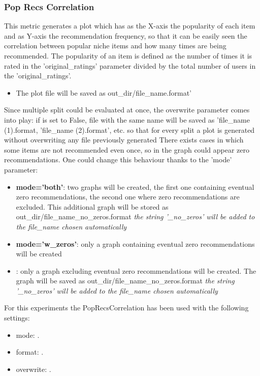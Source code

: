 \documentclass[11pt]{article}
\begin{document}
\subsubsection{Pop Recs Correlation}\label{sec:popRC}
This metric generates a plot which has as the X-axis the popularity of each item and as Y-axis the recommendation
frequency, so that it can be easily seen the correlation between popular niche items and how many times are being
recommended.
The popularity of an item is defined as the number of times it is rated in the 'original_ratings' parameter
divided by the total number of users in the 'original_ratings'.
\begin{itemize}
    \item The plot file will be saved as out_dir/file_name.format'
\end{itemize}
\hfill\break
\hfill\break
Since multiple split could be evaluated at once, the overwrite parameter comes into play:
if is set to False, file with the same name will be saved as 'file_name (1).format, 'file_name (2).format', etc.
so that for every split a plot is generated without overwriting any file previously generated
\hfill\break
\hfill\break
There exists cases in which some items are not recommended even once, so in the graph could appear
zero recommendations. One could change this behaviour thanks to the 'mode' parameter:
\begin{itemize}
    \item \textbf{mode='both'}: two graphs will be created, the first one containing eventual zero recommendations, the
      second one where zero recommendations are excluded. This additional graph will be stored as
      out_dir/file_name_no_zeros.format \textit{the string '_no_zeros' will be added to the file_name chosen automatically}
    \item \textbf{mode='w_zeros'}: only a graph containing eventual zero recommendations will be created
    \item {}: only a graph excluding eventual zero recommendations will be created. The graph will be
      saved as out_dir/file_name_no_zeros.format \textit{the string '_no_zeros' will be added to the file_name chosen automatically}
\end{itemize}
\hfill\break
\hfill\break
For this experiments the PopRecsCorrelation has been used with the following settings:
\begin{itemize}
    \item mode: .
    \item format: .
    \item overwrite: .
\end{itemize}
\hfill\break
\hfill\break
\end{document}

